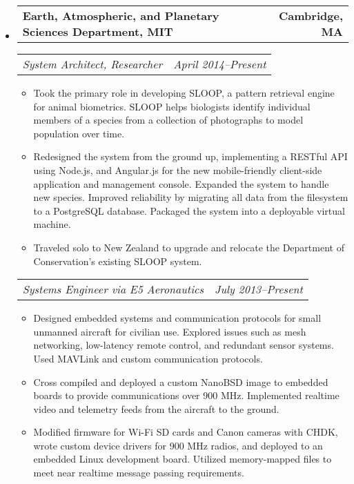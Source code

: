\documentclass[10pt,letterpaper]{article}
\newcommand{\headerrow}[2]{%
    \begin{tabularx}{\linewidth}{Xr}
	    #1 & #2 \\
    \end{tabularx}
}
\begin{document}
\begin{itemize}
    \item
    \headerrow{\textbf{Earth, Atmospheric, and Planetary Sciences Department, MIT}}
        {\textbf{Cambridge, MA}}
    \headerrow{\textit{System Architect, Researcher}}{\textit{April 2014--Present}}
    \begin{itemize}
        \item Took the primary role in developing SLOOP, a pattern retrieval
            engine for animal biometrics.  SLOOP helps biologists identify
            individual members of a species from a collection of photographs to
            model population over time.

        \item Redesigned the system from the ground up, implementing a RESTful
            API using Node.js, and Angular.js for the new mobile-friendly
            client-side application and management console. Expanded the system
            to handle new species.  Improved reliability by migrating all data
            from the filesystem to a PostgreSQL database.  Packaged the system
            into a deployable virtual machine.

        \item Traveled solo to New Zealand to upgrade and relocate the
            Department of Conservation's existing SLOOP system.
    \end{itemize}

    \headerrow{\textit{Systems Engineer via E5 Aeronautics}}
        {\textit{July 2013--Present}}
    \begin{itemize}
        \item Designed embedded systems and communication protocols for small
            unmanned aircraft for civilian use.  Explored
            issues such as mesh networking, low-latency remote control, and
            redundant sensor systems.  Used MAVLink and custom communication
            protocols.

        \item Cross compiled and deployed a custom NanoBSD image to embedded
            boards to provide communications over 900 MHz.  Implemented
            realtime video and telemetry feeds from the aircraft to the ground.

        \item Modified firmware for Wi-Fi SD cards and Canon cameras with CHDK,
            wrote custom device drivers for 900 MHz radios, and deployed to an
            embedded Linux development board.  Utilized memory-mapped files to
            meet near realtime message passing requirements.


\end{itemize}
\end{itemize}
\end{document}
